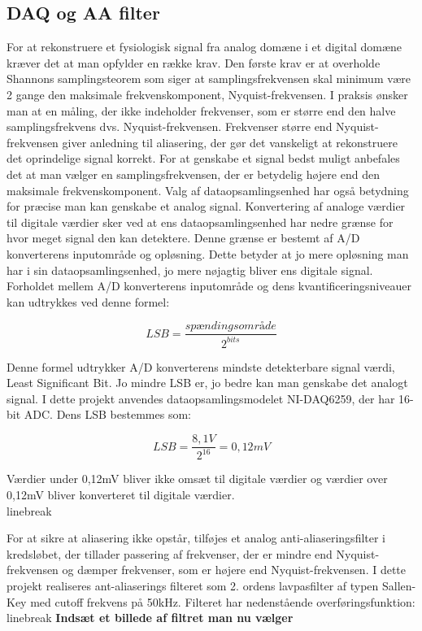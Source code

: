 \subsection{DAQ og AA filter}
For at rekonstruere et fysiologisk signal fra analog domæne i et digital domæne kræver det at man opfylder en række krav. Den første krav er at overholde Shannons samplingsteorem som siger at samplingsfrekvensen skal minimum være 2 gange den maksimale frekvenskomponent, Nyquist-frekvensen. I praksis ønsker man at en måling, der ikke indeholder frekvenser, som er større end den halve samplingsfrekvens dvs. Nyquist-frekvensen. Frekvenser større end Nyquist-frekvensen giver anledning til aliasering, der gør det vanskeligt at rekonstruere det oprindelige signal korrekt. For at genskabe et signal bedst muligt anbefales det at man vælger en samplingsfrekvensen, der er betydelig højere end den maksimale frekvenskomponent. Valg af dataopsamlingsenhed har også betydning for præcise man kan genskabe et analog signal. Konvertering af analoge værdier til digitale værdier sker ved at ens dataopsamlingsenhed har nedre grænse for hvor meget signal den kan detektere. Denne grænse er bestemt af A/D konverterens inputområde og opløsning. Dette betyder at jo mere opløsning man har i sin dataopsamlingsenhed, jo mere nøjagtig bliver ens digitale signal. Forholdet mellem A/D konverterens inputområde og dens kvantificeringsniveauer kan udtrykkes ved denne formel:

\begin{equation}
\label{eq2.12}
 LSB=  \dfrac{{spændingsområde}}{2^{bits}} 
\end{equation}

Denne formel udtrykker A/D konverterens mindste detekterbare signal værdi, Least Significant Bit.  Jo mindre LSB er, jo bedre kan man genskabe det analogt signal. I dette projekt anvendes dataopsamlingsmodelet NI-DAQ6259, der har 16-bit ADC. Dens LSB bestemmes som:
 
 
\begin{equation}
\label{eq2.13}
 LSB=  \dfrac{{8,1V}}{2^{16}} = 0,12mV
\end{equation} 
 
 Værdier under 0,12mV bliver ikke omsæt til digitale værdier og værdier over 0,12mV bliver konverteret til digitale værdier. \\linebreak
 
 For at sikre at aliasering ikke opstår, tilføjes et analog anti-aliaseringsfilter i kredsløbet, der tillader passering af frekvenser, der er mindre end Nyquist-frekvensen og dæmper frekvenser, som er højere end Nyquist-frekvensen. I dette projekt realiseres ant-aliaserings filteret som 2. ordens lavpasfilter af typen Sallen-Key  med cutoff frekvens på 50kHz. Filteret har nedenstående overføringsfunktion: 
 \\linebreak \textbf{Indsæt et billede af filtret man nu vælger}

